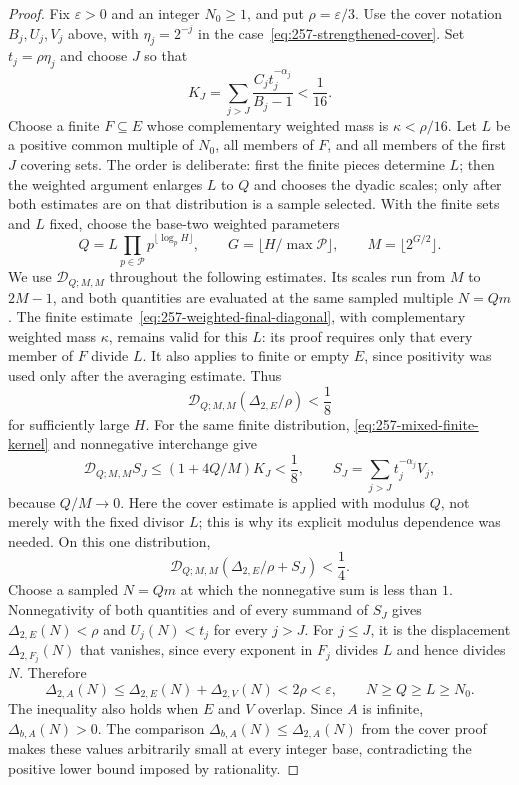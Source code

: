 \documentclass[11pt]{article}
\theoremstyle{plain}
\theoremstyle{definition}
\theoremstyle{remark}
\begin{document}
\begin{proof}
Fix $\varepsilon>0$ and an integer $N_0\ge1$, and put $\rho=\varepsilon/3$.
Use the cover notation $B_j,U_j,V_j$ above, with $\eta_j=2^{-j}$ in
the case~\eqref{eq:257-strengthened-cover}.  Set $t_j=\rho\eta_j$ and choose
$J$ so that
\[
 K_J=\sum_{j>J}\frac{C_jt_j^{-\alpha_j}}{B_j-1}<\frac1{16}.
\]
Choose a finite $F\subseteq E$ whose complementary weighted mass is
$\kappa<\rho/16$.  Let $L$ be a positive common multiple of $N_0$, all
members of $F$, and all members of the first $J$ covering sets. The order
is deliberate: first the finite pieces determine $L$; then the weighted
argument enlarges $L$ to $Q$ and chooses the dyadic scales; only after both
estimates are on that distribution is a sample selected. With the finite
sets and $L$ fixed, choose the base-two weighted parameters
\[
 Q=L\prod_{p\in\mathcal P}p^{\lfloor\log_pH\rfloor},\qquad
 G=\lfloor H/\max\mathcal P\rfloor,\qquad M=\lfloor2^{G/2}\rfloor.
\]
We use $\mathscr D_{Q;M,M}$ throughout the following estimates. Its
scales run from $M$ to $2M-1$, and both quantities are evaluated at the
same sampled multiple $N=Qm$.
The finite estimate~\eqref{eq:257-weighted-final-diagonal}, with complementary
weighted mass $\kappa$, remains valid for this $L$: its proof requires only
that every member of $F$ divide $L$.  It also applies to finite or empty $E$, since positivity was
used only after the averaging estimate.  Thus
\[
 \mathscr D_{Q;M,M}(\Delta_{2,E}/\rho)<\frac18
\]
for sufficiently large $H$.  For the same finite distribution, \eqref{eq:257-mixed-finite-kernel} and
nonnegative interchange give
\[
 \mathscr D_{Q;M,M}S_J\le(1+4Q/M)K_J<\frac18,
 \qquad S_J=\sum_{j>J}t_j^{-\alpha_j}V_j,
\]
because $Q/M\to0$. Here the cover estimate is applied with modulus
$Q$, not merely with the fixed divisor $L$; this is why its explicit
modulus dependence was needed. On this one distribution,
\[
 \mathscr D_{Q;M,M}(\Delta_{2,E}/\rho+S_J)<\frac14.
\]
Choose a sampled $N=Qm$ at which the nonnegative sum is less than $1$.
Nonnegativity of both quantities and of every summand of $S_J$ gives
$\Delta_{2,E}(N)<\rho$ and $U_j(N)<t_j$ for every $j>J$.
For $j\le J$, it is the displacement $\Delta_{2,F_j}(N)$ that vanishes,
since every exponent in $F_j$ divides $L$ and hence divides $N$. Therefore
\[
 \Delta_{2,A}(N)\le\Delta_{2,E}(N)+\Delta_{2,V}(N)<2\rho<\varepsilon,
 \qquad N\ge Q\ge L\ge N_0.
\]
The inequality also holds when $E$ and $V$ overlap. Since $A$ is
infinite, $\Delta_{b,A}(N)>0$. The comparison
$\Delta_{b,A}(N)\le\Delta_{2,A}(N)$ from the cover proof makes these
values arbitrarily small at every integer base, contradicting the
positive lower bound imposed by rationality.
\end{proof}
\end{document}
